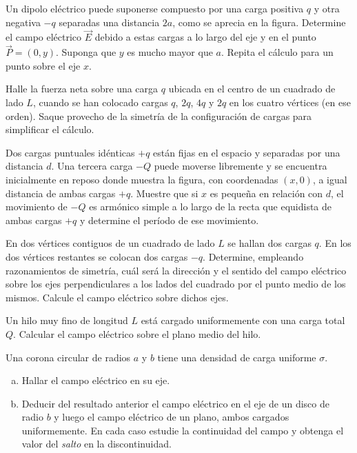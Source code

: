 \documentclass[problemas]{guia}
\begin{document}
\begin{problema}{} 
    Un dipolo eléctrico puede suponerse compuesto por una carga positiva $q$ y
    otra negativa $-q$ separadas una distancia $2a$, como se aprecia en la 
    figura. Determine el campo eléctrico $\vec{E}$ debido a estas cargas a lo 
    largo del eje y en el punto $\vec{P} = (0,y)$. Suponga que $y$ es mucho 
    mayor que $a$. Repita el cálculo para un punto sobre el eje $x$.
\end{problema}

\begin{problema}{} 
    Halle la fuerza neta sobre una carga $q$ ubicada en el centro de un 
    cuadrado de lado $L$, cuando se han colocado cargas $q$, $2q$, $4q$ y $2q$
    en los cuatro vértices (en ese orden). Saque provecho de la simetría de la
    configuración de cargas para simplificar el cálculo.
\end{problema}
 
\begin{problema}{} 
    Dos cargas puntuales idénticas $+q$ están fijas en el espacio y separadas 
    por una distancia $d$. Una tercera carga $-Q$ puede moverse libremente y 
    se encuentra inicialmente en reposo donde muestra la figura, con 
    coordenadas $(x,0)$, a igual distancia de ambas cargas $+q$. Muestre que 
    si $x$ es pequeña en relación con $d$, el movimiento de $-Q$ es armónico 
    simple a lo largo de la recta que equidista de ambas cargas $+q$ y 
    determine el período de ese movimiento.
\end{problema}

\begin{problema}{} 
    En dos vértices contiguos de un cuadrado de lado $L$ se hallan dos cargas 
    $q$. En los dos vértices restantes se colocan dos cargas $-q$. Determine, 
    empleando razonamientos de simetría, cuál será la dirección y el sentido 
    del campo eléctrico sobre los ejes perpendiculares a los lados del cuadrado
    por el punto medio de los mismos. Calcule el campo eléctrico sobre dichos 
    ejes.
\end{problema}

\begin{problema}{} 
    Un hilo muy fino de longitud $L$ está cargado uniformemente con una carga 
    total $Q$. Calcular el campo eléctrico sobre el plano medio del hilo.
\end{problema}

\begin{problema}{} 
    Una corona circular de radios $a$ y $b$ tiene una densidad de carga 
    uniforme $\sigma$.
    \begin{enumerate}[(a)]
        \item Hallar el campo eléctrico en su eje. 
        \item Deducir del resultado anterior el campo eléctrico en el eje de 
            un disco de radio $b$ y luego el campo eléctrico de un plano, ambos
            cargados uniformemente. En cada caso estudie la continuidad del 
            campo y obtenga el valor del {\it salto} en la discontinuidad.
    \end{enumerate}
\end{problema}
\end{document}
